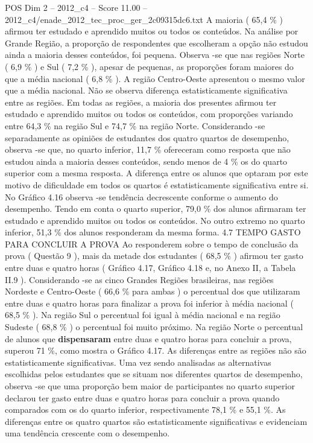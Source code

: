 \begin{textsample}{POS Dim 2 – 2012\_c4 – Score 11.00 – 2012\_c4/enade\_2012\_tec\_proc\_ger\_2c09315dc6.txt}
A maioria ( 65,4 \% ) afirmou ter estudado e aprendido muitos ou todos os conteúdos.
Na análise por Grande Região, a proporção de respondentes que escolheram a opção não estudou ainda a maioria desses conteúdos, foi pequena.
Observa -se que nas regiões Norte ( 6,9 \% ) e Sul ( 7,2 \% ), apesar de pequenas, as proporções foram maiores do que a média nacional ( 6,8 \% ).
A região Centro-Oeste apresentou o mesmo valor que a média nacional.
Não se observa diferença estatisticamente significativa entre as regiões.
Em todas as regiões, a maioria dos presentes afirmou ter estudado e aprendido muitos ou todos os conteúdos, com proporções variando entre 64,3 \% na região Sul e 74,7 \% na região Norte.
Considerando -se separadamente as opiniões de estudantes dos quatro quartos de desempenho, observa -se que, no quarto inferior, 11,7 \% ofereceram como resposta que não estudou ainda a maioria desses conteúdos, sendo menos de 4 \% os do quarto superior com a mesma resposta.
A diferença entre os alunos que optaram por este motivo de dificuldade em todos os quartos é estatisticamente significativa entre si.
No Gráfico 4.16 observa -se tendência decrescente conforme o aumento do desempenho.
Tendo em conta o quarto superior, 79,0 \% dos alunos afirmaram ter estudado e aprendido muitos ou todos os conteúdos.
No outro extremo no quarto inferior, 51,3 \% dos alunos responderam da mesma forma. 4.7 TEMPO GASTO PARA CONCLUIR A PROVA Ao responderem sobre o tempo de conclusão da prova ( Questão 9 ), mais da metade dos estudantes ( 68,5 \% ) afirmou ter gasto entre duas e quatro horas ( Gráfico 4.17, Gráfico 4.18 e, no Anexo II, a Tabela II.9 ).
Considerando -se as cinco Grandes Regiões brasileiras, nas regiões Nordeste e Centro-Oeste ( 66,6 \% para ambas ) o percentual dos que utilizaram entre duas e quatro horas para finalizar a prova foi inferior à média nacional ( 68,5 \% ).
Na região Sul o percentual foi igual à média nacional e na região Sudeste ( 68,8 \% ) o percentual foi muito próximo.
Na região Norte o percentual de alunos que \textbf{dispensaram} entre duas e quatro horas para concluir a prova, superou 71 \%, como mostra o Gráfico 4.17.
As diferenças entre as regiões não são estatisticamente significativas.
Uma vez sendo analisadas as alternativas escolhidas pelos estudantes que se situam nos diferentes quartos de desempenho, observa -se que uma proporção bem maior de participantes no quarto superior declarou ter gasto entre duas e quatro horas para concluir a prova quando comparados com os do quarto inferior, respectivamente 78,1 \% e 55,1 \%.
As diferenças entre os quatro quartos são estatisticamente significativas e evidenciam uma tendência crescente com o desempenho.

\end{textsample}
